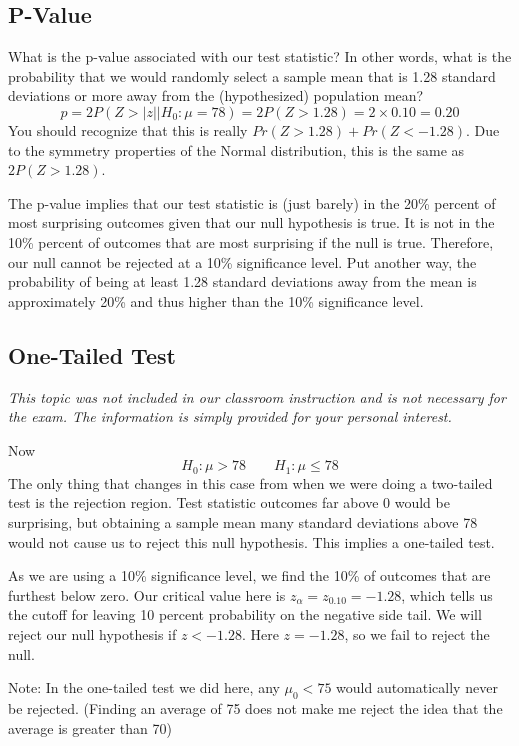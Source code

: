 \documentclass{./../../Latex/handout}
\begin{document}
\subsection*{P-Value} 

What is the p-value associated with our test statistic? In other words, what is the probability that we would randomly select a sample mean that is 1.28 standard deviations or more away from the (hypothesized) population mean? 
$$ p = 2P(Z>|z||H_0: \mu = 78) = 2P(Z>1.28) = 2 \times 0.10 = 0.20$$
You should recognize that this is really $Pr(Z > 1.28) + Pr(Z < -1.28)$. Due to the symmetry properties of the Normal distribution, this is the same as $2P(Z > 1.28)$. 

The p-value implies that our test statistic is (just barely) in the 20\% percent of most surprising outcomes given that our null hypothesis is true. It is not in the 10\% percent of outcomes that are most surprising if the null is true. Therefore, our null cannot be rejected at a 10\% significance level. Put another way, the probability of being at least 1.28 standard deviations away from the mean is approximately 20\% and thus higher than the 10\% significance level. 

\newpage
\subsection*{One-Tailed Test} 

\textit{This topic was not included in our classroom instruction and is not necessary for the exam. The information is simply provided for your personal interest.}

Now $$ H_0: \mu > 78 \quad \quad H_1: \mu \leq 78 $$
The only thing that changes in this case from when we were doing a two-tailed test is the rejection region. Test statistic outcomes far above 0 would be surprising, but obtaining a sample mean many standard deviations above 78 would not cause us to reject this null hypothesis. This implies a one-tailed test.

As we are using a 10\% significance level, we find the 10\% of outcomes that are furthest below zero. Our critical value here is $z_{\alpha} = z_{0.10} = -1.28$, which tells us the cutoff for leaving 10 percent probability on the negative side tail. We will reject our null hypothesis if $z<-1.28$. Here $z=-1.28$, so we fail to reject the null. 

Note: In the one-tailed test we did here, any $\mu_0<75$ would automatically never be rejected. (Finding an average of 75 does not  make  me reject the idea that the average is greater than 70)
\end{document}
